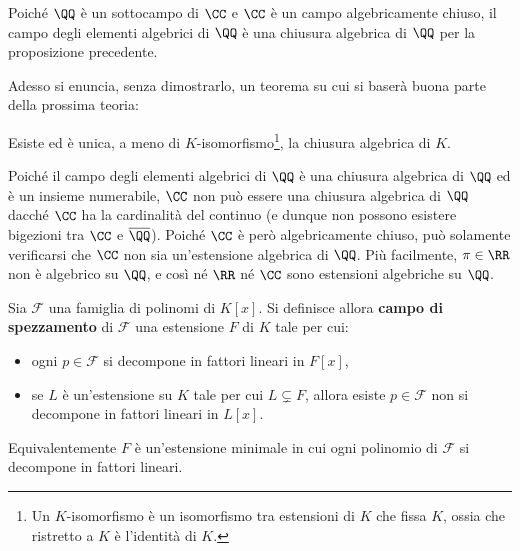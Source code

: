 \documentclass[12pt]{scrartcl}
\begin{document}
	\begin{remark}
		Poiché $\QQ$ è un sottocampo di $\CC$ e $\CC$ è
		un campo algebricamente chiuso, il campo degli
		elementi algebrici di $\QQ$ è una chiusura algebrica di
		$\QQ$ per la proposizione precedente.
	\end{remark}
	
	Adesso si enuncia, senza dimostrarlo, un teorema su cui si baserà buona parte della prossima teoria:
	
	\begin{theorem}
		Esiste ed è unica, a meno di $K$-isomorfismo\footnote{
			Un $K$-isomorfismo è un isomorfismo tra estensioni
			di $K$ che fissa $K$, ossia che ristretto a $K$ è
			l'identità di $K$.
		},
		la chiusura algebrica di $K$.
	\end{theorem}
	
	\begin{remark}
		Poiché il campo degli elementi algebrici di $\QQ$ è una chiusura algebrica di
		$\QQ$ ed è un insieme numerabile, $\CC$ non può
		essere una chiusura algebrica di $\QQ$ dacché
		$\CC$ ha la cardinalità del continuo (e dunque non possono
		esistere bigezioni tra $\CC$ e $\overline{\QQ}$). Poiché
		$\CC$ è però algebricamente chiuso, può solamente
		verificarsi che $\CC$ non sia un'estensione algebrica
		di $\QQ$. Più facilmente, $\pi \in \RR$ non è algebrico su $\QQ$,
		e così né $\RR$ né $\CC$ sono estensioni algebriche su $\QQ$.
	\end{remark}
	
	\begin{definition}
		Sia $\mathcal{F}$ una famiglia di polinomi di $K[x]$.
		Si definisce allora \textbf{campo di spezzamento} di
		$\mathcal{F}$ una estensione $F$ di $K$ tale per cui:
		
		\begin{itemize}
			\item ogni $p \in \mathcal{F}$ si decompone in fattori lineari in
				$F[x]$,
			\item se $L$ è un'estensione su $K$ tale per cui
				$L \subsetneq F$, allora esiste $p \in \mathcal{F}$
				non si decompone in fattori lineari in $L[x]$.
		\end{itemize}
		
		Equivalentemente $F$ è un'estensione minimale in cui
		ogni polinomio di $\mathcal{F}$ si decompone in fattori
		lineari.
	\end{definition}
	
\end{document}
